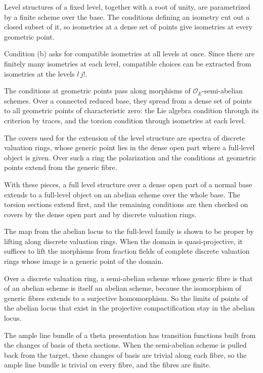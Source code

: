 Level structures of a fixed level, together with a root of unity, are parametrized by a finite scheme over
the base. The conditions defining an isometry cut out a closed subset of it, so isometries at a dense set of
points give isometries at every geometric point.

Condition (b) asks for compatible isometries at all levels at once. Since there are finitely many isometries
at each level, compatible choices can be extracted from isometries at the levels $l\,j!$.

The conditions at geometric points pass along morphisms of $\mathcal O_E$-semi-abelian schemes. Over a
connected reduced base, they spread from a dense set of points to all geometric points of characteristic
zero: the Lie algebra condition through its criterion by traces, and the torsion condition through
isometries at each level.

The covers used for the extension of the level structure are spectra of discrete valuation rings, whose
generic point lies in the dense open part where a full-level object is given. Over such a ring the
polarization and the conditions at geometric points extend from the generic fibre.

With these pieces, a full level structure over a dense open part of a normal base extends to a
full-level object on an abelian scheme over the whole base. The torsion sections extend first, and the
remaining conditions are then checked on covers by the dense open part and by discrete valuation rings.

The map from the abelian locus to the full-level family is shown to be proper by lifting along discrete
valuation rings. When the domain is quasi-projective, it suffices to lift the morphisms from fraction
fields of complete discrete valuation rings whose image is a generic point of the domain.

Over a discrete valuation ring, a semi-abelian scheme whose generic fibre is that of an abelian scheme is
itself an abelian scheme, because the isomorphism of generic fibres extends to a surjective homomorphism.
So the limits of points of the abelian locus that exist in the projective compactification stay in the
abelian locus.

The ample line bundle of a theta presentation has transition functions built from the changes of basis
of theta sections. When the semi-abelian scheme is pulled back from the target, these changes of basis
are trivial along each fibre, so the ample line bundle is trivial on every fibre, and the fibres are
finite.

